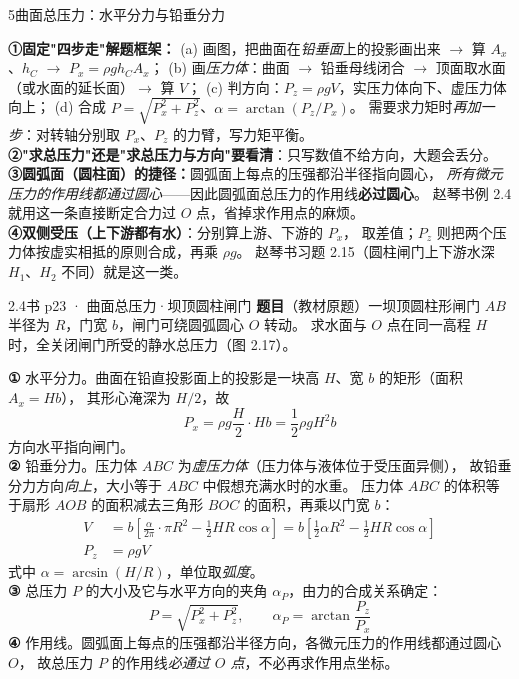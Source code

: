 \begin{kaodian}{5}{曲面总压力：水平分力与铅垂分力}
\begin{banfa}
\textbf{①固定"四步走"解题框架：}
(a) 画图，把曲面在\emph{铅垂面}上的投影画出来 $\to$ 算 $A_x$、$h_C$ $\to$ $P_x=\rho g h_C A_x$；
(b) 画\emph{压力体}：曲面 $\to$ 铅垂母线闭合 $\to$ 顶面取水面（或水面的延长面）$\to$ 算 $V$；
(c) 判方向：$P_z=\rho gV$，实压力体向下、虚压力体向上；
(d) 合成 $P=\sqrt{P_x^2+P_z^2}$、$\alpha=\arctan(P_z/P_x)$。
需要求力矩时\emph{再加一步}：对转轴分别取 $P_x$、$P_z$ 的力臂，写力矩平衡。\\
\textbf{②"求总压力"还是"求总压力与方向"要看清}：只写数值不给方向，大题会丢分。\\
\textbf{③圆弧面（圆柱面）的捷径：}圆弧面上每点的压强都沿半径指向圆心，
\emph{所有微元压力的作用线都通过圆心}——因此圆弧面总压力的作用线\textbf{必过圆心}。
赵琴书例 2.4 就用这一条直接断定合力过 $O$ 点，省掉求作用点的麻烦。\\
\textbf{④双侧受压（上下游都有水）}：分别算上游、下游的 $P_x$，
取差值；$P_z$ 则把两个压力体按虚实相抵的原则合成，再乘 $\rho g$。
赵琴书习题 2.15（圆柱闸门上下游水深 $H_1$、$H_2$ 不同）就是这一类。
\end{banfa}

\begin{liti}{2.4}{书 p23 · 曲面总压力·坝顶圆柱闸门}
\textbf{题目}（教材原题）一坝顶圆柱形闸门 $AB$ 半径为 $R$，门宽 $b$，闸门可绕圆弧圆心 $O$ 转动。
求水面与 $O$ 点在同一高程 $H$ 时，全关闭闸门所受的静水总压力（图 2.17）。

\begin{jie}
\textbf{① }水平分力。曲面在铅直投影面上的投影是一块高 $H$、宽 $b$ 的矩形（面积 $A_x=Hb$），
其形心淹深为 $H/2$，故
\[ P_x=\rho g\frac{H}{2}\cdot Hb=\frac{1}{2}\rho gH^2b \]
方向水平指向闸门。\\
\textbf{② }铅垂分力。压力体 $ABC$ 为\emph{虚压力体}（压力体与液体位于受压面异侧），
故铅垂分力方向\emph{向上}，大小等于 $ABC$ 中假想充满水时的水重。
压力体 $ABC$ 的体积等于扇形 $AOB$ 的面积减去三角形 $BOC$ 的面积，再乘以门宽 $b$：
\[
\begin{aligned}
V&=b\left[\frac{\alpha}{2\pi}\cdot\pi R^2-\frac{1}{2}HR\cos\alpha\right]
  =b\left[\frac{1}{2}\alpha R^2-\frac{1}{2}HR\cos\alpha\right]\\
P_z&=\rho gV
\end{aligned}
\]
式中 $\alpha=\arcsin(H/R)$，单位取\emph{弧度}。\\
\textbf{③ }总压力 $P$ 的大小及它与水平方向的夹角 $\alpha_P$，由力的合成关系确定：
\[ P=\sqrt{P_x^2+P_z^2},\qquad \alpha_P=\arctan\frac{P_z}{P_x} \]
\textbf{④ }作用线。圆弧面上每点的压强都沿半径方向，各微元压力的作用线都通过圆心 $O$，
故总压力 $P$ 的作用线\emph{必通过 $O$ 点}，不必再求作用点坐标。
\end{jie}
\end{liti}
\end{kaodian}

